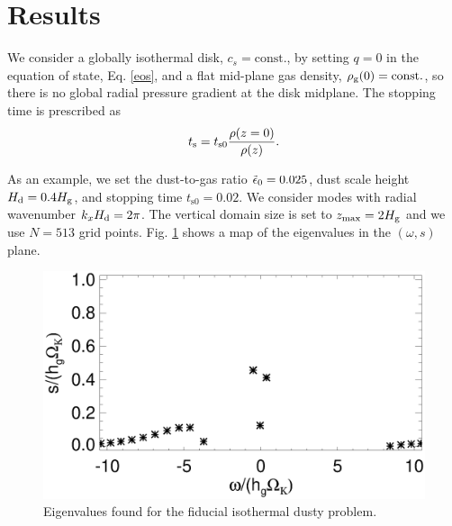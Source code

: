 \section{Results}

We consider a globally isothermal disk, $c_s=\mathrm{const.}$, by
setting $q=0$ in the equation of state, Eq. \ref{eos}, and a flat mid-plane 
gas density, $\rho_\mathrm{g}(0) = \mathrm{const.}$, so there is no global
radial pressure gradient at the disk midplane. The stopping time is
prescribed as 
\begin{align}
  t_\mathrm{s} = t_\mathrm{s0}\frac{\rho(z=0)}{\rho(z)}. 
\end{align}

As an example, we set the dust-to-gas ratio $\tilde{\epsilon}_0=0.025$, dust 
scale height $H_\mathrm{d}=0.4H_\mathrm{g}$, and stopping time
$t_\mathrm{s0}=0.02$. We consider modes with radial wavenumber
$k_xH_\mathrm{d}=2\pi$. The vertical domain size is set to 
$z_\mathrm{max}=2H_\mathrm{g}$ and we use $N=513$ grid points. Fig. \ref{eigen_map}
shows a map of the eigenvalues in the $(\omega, s)$ plane. 

\begin{figure}
  \includegraphics[width=\linewidth]{figures/eigenvalues}
  \caption{Eigenvalues found for the fiducial isothermal dusty
    problem.
  \label{eigen_map}} 
\end{figure}

